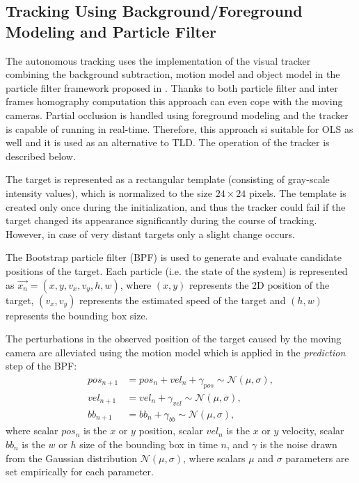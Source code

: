 \subsection{Tracking Using Background/Foreground Modeling and Particle Filter} \label{txt:bgfg_tracker}

The autonomous tracking uses the implementation of the visual tracker combining the background subtraction, motion model and object model in the particle filter framework  proposed in \cite{ObjectTrackinginMonochromaticVideo}. Thanks to both particle filter and inter frames homography computation this approach can even cope with the moving cameras. Partial occlusion is handled using foreground modeling and the tracker is capable of running in real-time. Therefore, this approach si suitable for OLS as well and it is used as an alternative to TLD. The operation of the tracker is described below.

The target is represented as a rectangular template (consisting of gray-scale intensity values), which is normalized to the size $24\times24$ pixels. The template is created only once during the initialization, and thus the tracker could fail if the target changed its appearance significantly during the course of tracking. However, in case of very distant targets only a slight change occurs.

The Bootstrap particle filter (BPF) \cite{Isard98condensation} is used to generate and evaluate candidate positions of the target. Each particle (i.e. the state of the system) is represented as $\vec{x_{n}} = (x, y, v_{x}, v_{y}, h, w)$, where $(x, y)$ represents the 2D position of the target, $(v_{x}, v_{y})$ represents the estimated speed of the target and $(h, w)$ represents the bounding box size. 

The perturbations in the observed position of the target caused by the moving camera are alleviated using the motion model which is applied in the \textit{prediction} step of the BPF:
\begin{align}
	pos_{n+1} &= pos_{n} + vel_{n} + \gamma_{pos} \sim \mathcal{N}(\mu, \sigma),\\ \label{eq:bgfg_pos_prediction}
	vel_{n+1} &= vel_{n} + \gamma_{vel} \sim \mathcal{N}(\mu, \sigma),\\
	bb_{n+1} &= bb_{n} + \gamma_{bb} \sim \mathcal{N}(\mu, \sigma),	
\end{align}
where scalar $pos_{n}$ is the $x$ or $y$ position, scalar $vel_{n}$ is the $x$ or $y$ velocity, scalar $bb_{n}$ is the $w$ or $h$ size of the bounding box in time $n$, and $\gamma$ is the noise drawn from the Gaussian distribution $\mathcal{N}(\mu, \sigma)$, where scalars $\mu$ and $\sigma$ parameters are set empirically for each parameter.

